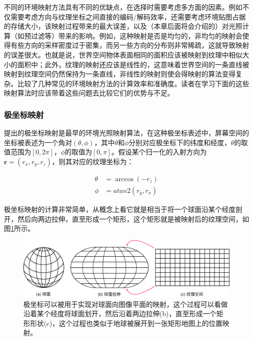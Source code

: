 不同的环境映射方法具有不同的优缺点，在选择时需要考虑多方面的因素。例如不仅需要考虑方向与纹理坐标之间直接的编码/解码效率，还需要考虑环境贴图占据的存储大小，该映射过程带来的最大误差，以及（本章后面将会介绍的）对光照计算（如预过滤等）带来的影响。例如，这种映射是否是均匀的，非均匀的映射会使得有些方向的采样密度过于密集，而另一些方向的分布则非常稀疏，这就导致映射的误差很大。也就是说，世界空间物体表面相同的面积应该被映射到纹理中相似大小的面积中；此外，纹理的映射还应该是线性的，这意味着世界空间的一条直线被映射到纹理空间仍然保持为一条直线，非线性的映射则使会得映射的算法变得复杂。\cite{a:ASurveyofEfficientRepresentationsforIndependentUnitVectors, a:ALightFieldRepresentationforRealTimeGlobalIllumination}比较了几种常见的环境映射方法的计算效率和准确度。读者在学习下面的这些映射算法时应该带着这些问题去比较它们的优势与不足。



\subsubsection{极坐标映射}
\cite{a:Textureandreflectionincomputergeneratedimages}提出的极坐标映射是最早的环境光照映射算法，在这种极坐标表述中，屏幕空间的坐标被表述为一个角对$(\theta,\phi)$，其中$\theta$和$\phi$分别对应极坐标下的纬度和经度，$\theta$的取值范围为$[0,2\pi]$，$\phi$的取值为$[0,\pi]$。假设某个归一化的入射方向为$\mathbf{r}=(r_x,r_y,r_z)$，则其对应的纹理坐标为：

\begin{equation}
	\begin{aligned}
		\theta &= \arccos(-r_z) \\
		\phi &=atan2(r_y,r_x)
	\end{aligned}
\end{equation}

极坐标映射的计算非常简单，从概念上看它就是相当于将一个球面沿某个经度剖开，然后向两边拉伸，直至形成一个矩形，这个矩形就是被映射后的纹理空间，如图\ref{f:pl-polar-coordinates}所示。

\begin{figure}
	\includegraphics[width=\textwidth]{figures/pl/polar-coordinates}
	\caption{极坐标可以被用于实现对球面向图像平面的映射，这个过程可以看做沿着某个经度将球面划开，然后沿着两边拉伸(b)，直至形成一个矩形形状(c)，这个过程也类似于地球被展开到一张矩形地图上的位置映射。}
	\label{f:pl-polar-coordinates}
\end{figure}

